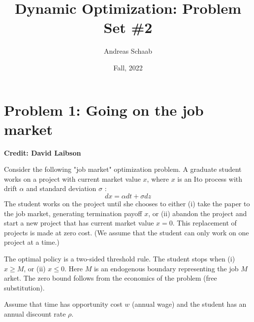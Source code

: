 \documentclass[11pt]{extarticle}
\title{Dynamic Optimization: Problem Set \#2}
\author{Andreas Schaab}
\date{Fall, 2022}
\theoremstyle{plain}
\theoremstyle{definition}
\begin{document}
\maketitle
\thispagestyle{empty}
\setcounter{page}{0}


\vspace{10mm}
\section*{Problem 1: Going on the job market}

\textbf{Credit: David Laibson} 

Consider the following "job market" optimization problem.
A graduate student works on a project with current market value $x$, where $x$ is an Ito process with drift $\alpha$ and standard deviation $\sigma$ :
$$
d x=\alpha d t+\sigma d z
$$
The student works on the project until she chooses to either (i) take the paper to the job market, generating termination payoff $x$, or (ii) abandon the project and start a new project that has current market value $x=0$. This replacement of projects is made at zero cost. (We assume that the student can only work on one project at a time.)

The optimal policy is a two-sided threshold rule. The student stops when (i) $x \geq M$, or (ii) $x \leq 0$. Here $M$ is an endogenous boundary representing the job $M$ arket. The zero bound follows from the economics of the problem (free substitution).

Assume that time has opportunity cost $w$ (annual wage) and the student has an annual discount rate $\rho$.
\end{document}
